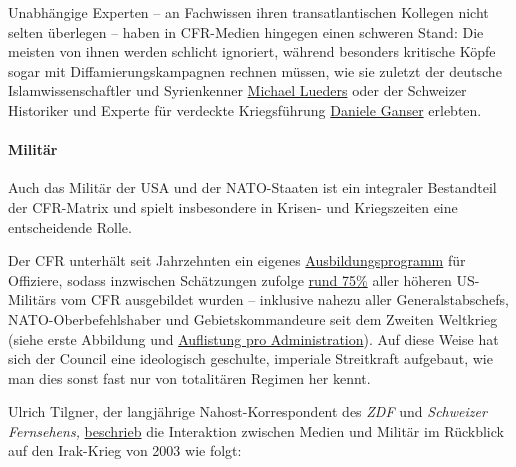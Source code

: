Unabhängige Experten -- an Fachwissen ihren transatlantischen Kollegen
nicht selten überlegen -- haben in CFR-Medien hingegen einen schweren
Stand: Die meisten von ihnen werden schlicht ignoriert, während
besonders kritische Köpfe sogar mit Diffamierungs­kampagnen rechnen
müssen, wie sie zuletzt der deutsche Islam­wissen­schaftler und
Syrienkenner \href{http://www.nachdenkseiten.de/?p=37845}{Michael
Lueders} oder der Schweizer Historiker und Experte für verdeckte
Kriegsführung
\href{https://swprs.org/anschlag-auf-die-forschungsfreiheit/}{Daniele
Ganser} erlebten.

\hypertarget{milituxe4r}{%
\paragraph{Militär}\label{milituxe4r}}

Auch das Militär der USA und der NATO-Staaten ist ein integraler
Bestandteil der CFR-Matrix und spielt insbesondere in Krisen- und
Kriegszeiten eine entscheidende Rolle.

Der CFR unterhält seit Jahrzehnten ein eigenes
\href{https://www.cfr.org/fellowships/military-fellowship}{Ausbildungs­programm}
für Offiziere, sodass inzwischen Schätzungen zufolge
\href{http://www.renewamerica.com/columns/baldwin/090707}{rund 75\%}
aller höheren US-Militärs vom CFR ausgebildet wurden -- inklusive nahezu
aller Generalstabschefs, NATO-Oberbefehlshaber und Gebietskommandeure
seit dem Zweiten Weltkrieg (siehe erste Abbildung und
\href{https://swprs.files.wordpress.com/2017/07/cfr-administration-members-1900-2014.pdf}{Auflistung
pro Administration}). Auf diese Weise hat sich der Council eine
ideologisch geschulte, imperiale Streitkraft aufgebaut, wie man dies
sonst fast nur von totalitären Regimen her kennt.

Ulrich Tilgner, der langjährige Nahost-Korrespondent des \emph{ZDF} und
\emph{Schweizer Fernsehens,}
\href{https://www.amazon.de/inszenierte-Krieg-T\%C3\%A4uschung-Wahrheit-Husseins/dp/3871344923}{beschrieb}
die Interaktion zwischen Medien und Militär im Rückblick auf den
Irak-Krieg von 2003 wie folgt:

